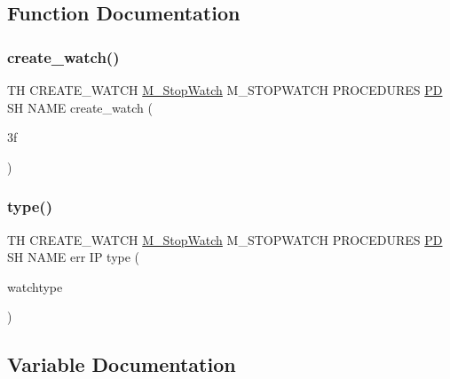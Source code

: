 \subsection{Function Documentation}
\mbox{\label{create__watch_83_8txt_a6deb35ddebb447c9dceca30690d1581d}} 
\subsubsection{\texorpdfstring{create\+\_\+watch()}{create\_watch()}}
{\footnotesize\ttfamily TH C\+R\+E\+A\+T\+E\+\_\+\+W\+A\+T\+CH \hyperlink{option__stopwatch_83_8txt_aa2011fc45a5e502e87ee50996a8a9305}{M\+\_\+\+Stop\+Watch} M\+\_\+\+S\+T\+O\+P\+W\+A\+T\+CH P\+R\+O\+C\+E\+D\+U\+R\+ES \hyperlink{what__overview_81_8txt_a85f26da5a4481fbdb0d9c79f2b94de3e}{PD} SH N\+A\+ME create\+\_\+watch (\begin{DoxyParamCaption}\item[{3f}]{ }\end{DoxyParamCaption})}

\mbox{\label{create__watch_83_8txt_a6036c8b9d18bd95ef0feb888982faa0b}} 
\subsubsection{\texorpdfstring{type()}{type()}}
{\footnotesize\ttfamily TH C\+R\+E\+A\+T\+E\+\_\+\+W\+A\+T\+CH \hyperlink{option__stopwatch_83_8txt_aa2011fc45a5e502e87ee50996a8a9305}{M\+\_\+\+Stop\+Watch} M\+\_\+\+S\+T\+O\+P\+W\+A\+T\+CH P\+R\+O\+C\+E\+D\+U\+R\+ES \hyperlink{what__overview_81_8txt_a85f26da5a4481fbdb0d9c79f2b94de3e}{PD} SH N\+A\+ME err IP type (\begin{DoxyParamCaption}\item[{watchtype}]{ }\end{DoxyParamCaption})}



\subsection{Variable Documentation}
\mbox{\label{create__watch_83_8txt_ae5a722940632dbef0e5f6b03622fbf1c}} 

